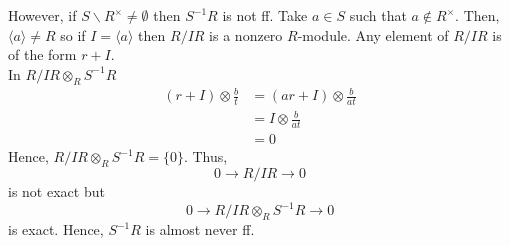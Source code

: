 \documentclass[oneside, 12pt]{scrbook}
\newcommand{\bs}{\backslash}
\theoremstyle{theorem}
\begin{document}
\begin{remark}
However, if $S\bs R^{\times} \neq \emptyset$ then $S^{-1}R$ is not ff. Take $a\in S$ such that $a \not \in R^{\times}$. Then, $\langle a \rangle \neq R$ so if $I = \langle a \rangle$ then $R/IR$ is a nonzero $R$-module. Any element of $R/IR$ is of the form $r + I$. \\

In $R/IR \otimes_{R} S^{-1}R$
\begin{align*}
(r+ I) \otimes \frac{b}{t} &= (ar+I) \otimes \frac{b}{at} \\
&= I \otimes \frac{b}{at} \\
&= 0
\end{align*}
Hence, $R/IR \otimes_{R} S^{-1}R = \{0\}$. Thus, $$0 \longrightarrow R/IR \longrightarrow 0$$ is not exact but $$0 \longrightarrow R/IR\otimes_{R} S^{-1}R \longrightarrow 0$$ is exact. Hence, $S^{-1}R$ is almost never ff.
\end{remark}
\end{document}
